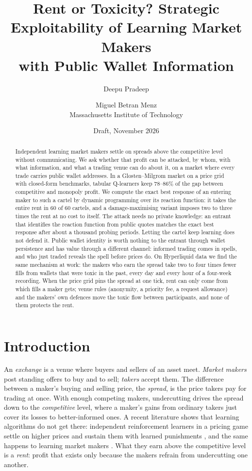 \documentclass[11pt]{article}
\title{Rent or Toxicity? Strategic Exploitability of Learning Market Makers\\ with Public Wallet Information}
\author{Deepu Pradeep \and Miguel Betran Menz\\ \small Massachusetts Institute of Technology}
\date{Draft, November 2026}
\begin{document}
\maketitle

\begin{abstract}
Independent learning market makers settle on spreads above the competitive level without communicating. We ask whether that profit can be attacked, by whom, with what information, and what a trading venue can do about it, on a market where every trade carries public wallet addresses. In a Glosten--Milgrom market on a price grid with closed-form benchmarks, tabular Q-learners keep 78--86\% of the gap between competitive and monopoly profit. We compute the exact best response of an entering maker to such a cartel by dynamic programming over its reaction function: it takes the entire rent in 60 of 60 cartels, and a damage-maximising variant imposes two to three times the rent at no cost to itself. The attack needs no private knowledge: an entrant that identifies the reaction function from public quotes matches the exact best response after about a thousand probing periods. Letting the cartel keep learning does not defend it. Public wallet identity is worth nothing to the entrant through wallet persistence and has value through a different channel: informed trading comes in spells, and who just traded reveals the spell before prices do. On Hyperliquid data we find the same mechanism at work: the makers who earn the spread take two to four times fewer fills from wallets that were toxic in the past, every day and every hour of a four-week recording. When the price grid pins the spread at one tick, rent can only come from which fills a maker gets; venue rules (anonymity, a priority fee, a request allowance) and the makers' own defences move the toxic flow between participants, and none of them protects the rent.
\end{abstract}

\section{Introduction}

An \emph{exchange} is a venue where buyers and sellers of an asset meet. \emph{Market makers} post standing offers to buy and to sell; \emph{takers} accept them. The difference between a maker's buying and selling price, the \emph{spread}, is the price takers pay for trading at once. With enough competing makers, undercutting drives the spread down to the \emph{competitive} level, where a maker's gains from ordinary takers just cover its losses to better-informed ones. A recent literature shows that learning algorithms do not get there: independent reinforcement learners in a pricing game settle on higher prices and sustain them with learned punishments \cite{calvano}, and the same happens to learning market makers \cite{cfl,cont}. What they earn above the competitive level is a \emph{rent}: profit that exists only because the makers refrain from undercutting one another.
\end{document}
